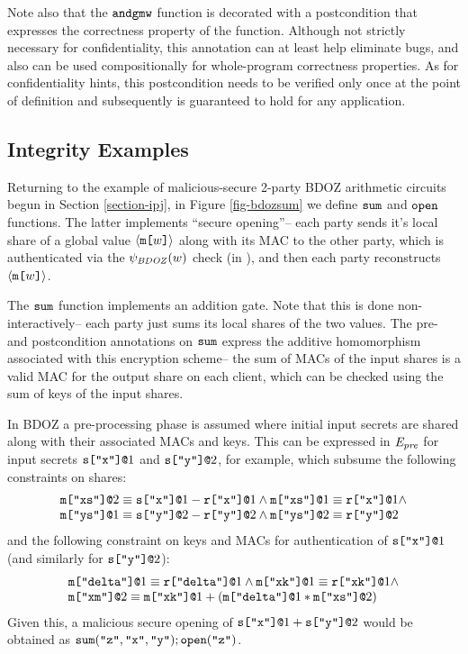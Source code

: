 Note also that the $\texttt{andgmw}$ function is decorated with a
postcondition that expresses the correctness property of the
function. Although not strictly necessary for confidentiality, this
annotation can at least help eliminate bugs, and also can be used
compositionally for whole-program correctness properties. As for
confidentiality hints, this postcondition needs to be verified only
once at the point of definition and subsequently is guaranteed to hold
for any application.

\subsection{Integrity Examples}



Returning to the example of malicious-secure 2-party BDOZ arithmetic
circuits begun in Section \ref{section-ipj}, in Figure \ref{fig-bdozsum} we
define $\texttt{sum}$ and $\texttt{open}$ functions. The latter implements
``secure opening''-- each party sends it's local share of a
global value $\langle \texttt{m[}w\texttt{]} \rangle$ along with its MAC to the other party,
which is authenticated via the $\psi_{\mathit{BDOZ}}(w)$ check (in ),
and then each party reconstructs $\langle \texttt{m[}w\texttt{]} \rangle$. 

The $\texttt{sum}$ function implements an addition gate. Note that this
is done non-interactively-- each party just sums its local shares
of the two values. The pre- and postcondition annotations
on $\texttt{sum}$ express the additive homomorphism associated
with this encryption scheme-- the sum of MACs of the input
shares is a valid MAC for the output share on each client,
which can be checked using the sum of keys of the input shares. 

In BDOZ a pre-processing phase is assumed where initial input secrets
are shared along with their associated MACs and keys. This can be
expressed in $\mathit{E}_{\mathit{pre}}$ for input secrets $\texttt{s[}\texttt{"x"}\texttt{]}\texttt{@}1$ and
$\texttt{s[}\texttt{"y"}\texttt{]}\texttt{@}2$, for example, which subsume the following
constraints on shares:
{\footnotesize$$
\begin{array}{l}
\texttt{m[}\texttt{"xs"}\texttt{]}\texttt{@}2 \equiv \texttt{s[}\texttt{"x"}\texttt{]}\texttt{@}1 - \texttt{r[}\texttt{"x"}\texttt{]}\texttt{@}1 \wedge 
\texttt{m[}\texttt{"xs"}\texttt{]}\texttt{@}1 \equiv \texttt{r[}\texttt{"x"}\texttt{]}\texttt{@}1 \wedge \\
\texttt{m[}\texttt{"ys"}\texttt{]}\texttt{@}1 \equiv \texttt{s[}\texttt{"y"}\texttt{]}\texttt{@}2 - \texttt{r[}\texttt{"y"}\texttt{]}\texttt{@}2 \wedge 
\texttt{m[}\texttt{"ys"}\texttt{]}\texttt{@}2 \equiv \texttt{r[}\texttt{"y"}\texttt{]}\texttt{@}2 
\end{array}
$$}
and the following constraint on keys and MACs for authentication
of $\texttt{s[}\texttt{"x"}\texttt{]}\texttt{@}1$ (and similarly for $\texttt{s[}\texttt{"y"}\texttt{]}\texttt{@}2$):
{\footnotesize$$
\begin{array}{l}
\texttt{m[}\texttt{"delta"}\texttt{]}\texttt{@}1 \equiv \texttt{r[}\texttt{"delta"}\texttt{]}\texttt{@}1 \wedge
\texttt{m[}\texttt{"xk"}\texttt{]}\texttt{@}1 \equiv \texttt{r[}\texttt{"xk"}\texttt{]}\texttt{@}1 \wedge\\
\texttt{m[}\texttt{"xm"}\texttt{]}\texttt{@}2 \equiv \texttt{m[}\texttt{"xk"}\texttt{]}\texttt{@}1 + (\texttt{m[}\texttt{"delta"}\texttt{]}\texttt{@}1 * \texttt{m[}\texttt{"xs"}\texttt{]}\texttt{@}2)
\end{array}
$$}
Given this, a malicious secure opening of $\texttt{s[}\texttt{"x"}\texttt{]}\texttt{@}1 +
\texttt{s[}\texttt{"y"}\texttt{]}\texttt{@}2$ would be obtained as
$\texttt{sum}(\texttt{"z"},\texttt{"x"},\texttt{"y"}); \texttt{open}(\texttt{"z"})$.

